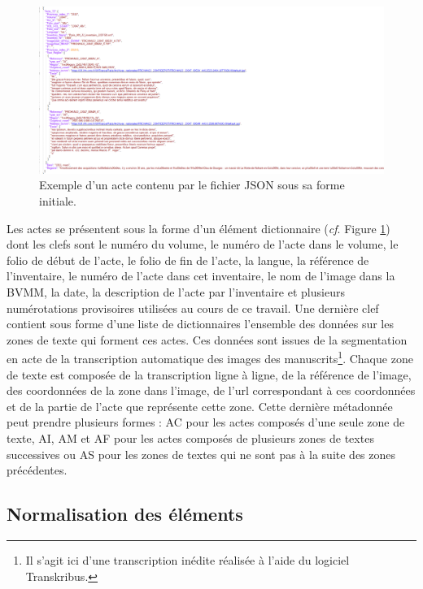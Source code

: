 \documentclass[a4paper,12pt,twoside]{book}
\begin{document}
	\begin{figure}
		\centering
		\includegraphics[width=\textwidth]{Images/json_zones_textes.png}
		\caption{Exemple d'un acte contenu par le fichier JSON sous sa forme initiale.}
		\label{json_initial}
	\end{figure}
	
	Les actes se présentent sous la forme d'un élément dictionnaire (\textit{cf}. Figure \ref{json_initial}) dont les clefs sont le numéro du volume, le numéro de l'acte dans le volume, le folio de début de l'acte, le folio de fin de l'acte, la langue, la référence de l'inventaire, le numéro de l'acte dans cet inventaire, le nom de l'image dans la BVMM, la date, la description de l'acte par l'inventaire et plusieurs numérotations provisoires utilisées au cours de ce travail. Une dernière clef contient sous forme d'une liste de dictionnaires l'ensemble des données sur les zones de texte qui forment ces actes. Ces données sont issues de la segmentation en acte de la transcription automatique des images des manuscrits\footnote{Il s'agit ici d'une transcription inédite réalisée à l'aide du logiciel Transkribus.}. Chaque zone de texte est composée de la transcription ligne à ligne, de la référence de l'image, des coordonnées de la zone dans l'image, de l'url correspondant à ces coordonnées et de la partie de l'acte que représente cette zone. Cette dernière métadonnée peut prendre plusieurs formes : \og AC\fg{} pour les actes composés d'une seule zone de texte, \og AI\fg{}, \og AM\fg{} et \og AF\fg{} pour les actes composés de plusieurs zones de textes successives ou \og AS\fg{} pour les zones de textes qui ne sont pas à la suite des zones précédentes.
	
	\subsection{Normalisation des éléments}
	
\end{document}
